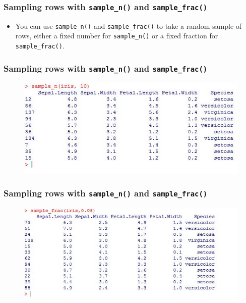 \documentclass{beamer}
\begin{document}
\begin{frame}
\frametitle{Sampling rows with \texttt{sample\_n()} and \texttt{sample\_frac()}}
\begin{itemize}
\item You can use \texttt{sample\_n()} and \texttt{sample\_frac()} to take a random sample of rows, either a fixed number for \texttt{sample\_n()} or a fixed fraction for \texttt{sample\_frac()}.
\end{itemize}
\end{frame}

\begin{frame}
\frametitle{Sampling rows with \texttt{sample\_n()} and \texttt{sample\_frac()}}

\begin{figure}
\centering
\includegraphics[width=1.07\linewidth]{irissample1}
\end{figure}

\end{frame}
\begin{frame}
	\frametitle{Sampling rows with \texttt{sample\_n()} and \texttt{sample\_frac()}}
	
	\begin{figure}
		\centering
		\includegraphics[width=1.07\linewidth]{irissample2}
	\end{figure}
	
\end{frame}
\end{document}
